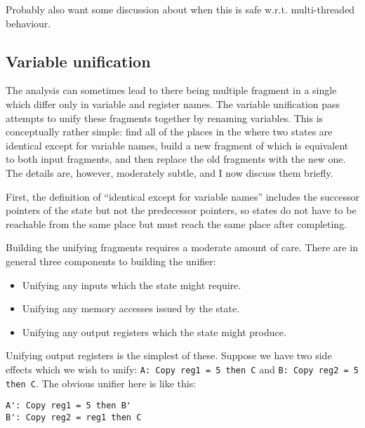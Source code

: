 Probably also want some discussion about when this is safe w.r.t.
multi-threaded behaviour.

\subsection{Variable unification}
\label{sect:unification}

The analysis can sometimes lead to there being multiple fragment in a
single \StateMachine which differ only in variable and register names.
The variable unification pass attempts to unify these fragments
together by renaming variables.  This is conceptually rather simple:
find all of the places in the \StateMachine where two states are
identical except for variable names, build a new fragment of
\StateMachine which is equivalent to both input fragments, and then
replace the old fragments with the new one.  The details are, however,
moderately subtle, and I now discuss them briefly.

First, the definition of ``identical except for variable names''
includes the successor pointers of the state but not the predecessor
pointers, so states do not have to be reachable from the same place
but must reach the same place after completing.

Building the unifying \StateMachine fragments requires a moderate
amount of care.  There are in general three components to building the
unifier:

\begin{itemize}
\item
  Unifying any inputs which the state might require.
\item
  Unifying any memory accesses issued by the state.
\item
  Unifying any output registers which the state might produce.
\end{itemize}

Unifying output registers is the simplest of these.  Suppose we have
two side effects which we wish to unify:
\verb|A: Copy reg1 = 5 then C| and \verb|B: Copy reg2 = 5 then C|.
The obvious unifier here is like this:

\begin{verbatim}
A': Copy reg1 = 5 then B'
B': Copy reg2 = reg1 then C
\end{verbatim}

